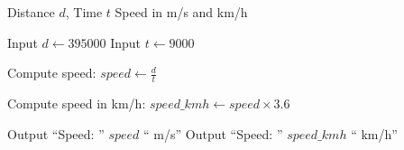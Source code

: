 \begin{algorithm}
\caption{Compute Speed of Plane}
\begin{algorithmic}[1]
\REQUIRE Distance $d$, Time $t$
\ENSURE Speed in m/s and km/h

\STATE Input $d \gets 395000$
\STATE Input $t \gets 9000$

\STATE Compute speed:
\STATE $speed \gets \frac{d}{t}$

\STATE Compute speed in km/h:
\STATE $speed\_kmh \gets speed \times 3.6$

\STATE Output ``Speed: '' $speed$ `` m/s''
\STATE Output ``Speed: '' $speed\_kmh$ `` km/h''

\end{algorithmic}
\end{algorithm}